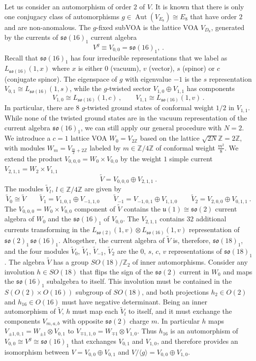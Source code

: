 \documentclass[11pt,reqno]{article}
\newcommand{\be}{\begin{equation}}
\newcommand{\ee}{\end{equation}}
\DeclareMathOperator{\Aut}{Aut}
\newcommand{\ZZ}{\mathbb{Z}}
\newcommand{\alg}[1]{\mathfrak{#1}}
\begin{document}
Let us consider an automorphism of order $2$ of $V$. It is known that there is only one conjugacy class of automorphisms $g\in \Aut(V_{E_8})\cong E_8$ that have order $2$ and are non-anomalous. The $g$-fixed subVOA is the lattice VOA $V_{D_8}$, generated by the currents of $\alg{so}(16)_1$ current algebra
\be V^g\equiv V_{0,0}=\alg{so}(16)_1,\ .
\ee Recall that $\alg{so}(16)_1$ has four irreducible representations that we label as $L_{\alg{so}(16)}(1,x)$ where $x$ is either $0$ (vacuum), $v$ (vector), $s$ (spinor) or $c$ (conjugate spinor). The eigenspace of $g$ with eigenvalue $-1$ is the $s$ representation $V_{0,1}\cong L_{\alg{so}(16)}(1,s)$, while the $g$-twisted sector $V_{1,0}\oplus V_{1,1}$ has components
\be V_{1,0}\cong  L_{\alg{so}(16)}(1,c)\ ,\qquad   V_{1,1}\cong L_{\alg{so}(16)}(1,v)\ .
\ee In particular, there are $8$ $g$-twisted ground states of conformal weight $1/2$ in $V_{1,1}$. While none of the twisted ground states are in the vacuum representation of the current algebra $\alg{so}(16)_1$, we can still apply our general procedure with $N=2$. We introduce a $c=1$ lattice VOA $W_0=V_{2\ZZ}$ based on the lattice $\sqrt{2N}\ZZ=2\ZZ$, with modules $W_m=V_{\frac{m}{2}+2\ZZ}$ labeled by $m\in \ZZ/4\ZZ$ of conformal weight $\frac{m^2}{8}$. We extend the product $V_{0,0,0}=W_0\times V_{0,0}$ by the weight $1$ simple current $V_{2,1,1}=W_2\times V_{1,1}$
\be \tilde V=V_{0,0,0}\oplus V_{2,1,1}\ .
\ee The modules $\tilde V_l$, $l\in\ZZ/4\ZZ$ are given by
\be \tilde V_0\cong \tilde V\qquad \tilde V_1=V_{1,0,1}\oplus V_{-1,1,0}\qquad \tilde V_{-1}=V_{-1,0,1}\oplus V_{1,1,0}\qquad \tilde V_2=V_{2,0,0}\oplus V_{0,1,1}\ .
\ee The $V_{0,0,0}=W_0\times V_{0,0}$ component of $\tilde V$ contains the $\alg{u}(1)\cong \alg{so}(2)$ current algebra of $W_0$ and the $\alg{so}(16)_1$ of $V_{0,0}$. The $V_{2,1,1}$ contains $32$ additional currents transforming in the $L_{\alg{so}(2)}(1,v)\otimes L_{\alg{so}(16)}(1,v)$ representation of $\alg{so}(2)_1\, \alg{so}(16)_1$. Altogether, the current algebra of $\tilde V$ is, therefore, $\alg{so}(18)_1$, and the four modules $\tilde V_0$, $\tilde V_1$, $\tilde  V_{-1}$, $\tilde V_2$ are the $0$, $s$, $c$, $v$ representations of $\alg{so}(18)_1$. The algebra $\tilde V$ has a group $SO(18)/\ZZ_2$ of inner automorphisms. Consider any involution $h\in SO(18)$ that flips the sign of the $\alg{so}(2)$ current in $W_0$ and maps the $\alg{so}(16)_1$ subalgebra to itself. This involution must be contained in the $S(O(2)\times O(16))$ subgroup of $SO(18)$, and both projections $h_2\in O(2)$ and $h_{16}\in O(16)$ must have negative determinant. Being an inner automorphism of $\tilde V$, $h$ must map each $\tilde V_l$ to itself, and it must exchange the components $V_{m,a,b}$ with opposite $\alg{so}(2)$ charge $m$. In particular $h$ maps $V_{\pm 1, 0,1}=W_{\pm 1}\otimes V_{0,1}$ to $V_{\mp 1,1,0}=W_{\mp 1}\otimes V_{1,0}$. Thus $h_{16}$ is an automorphism of $V_{0,0}\cong V^g\cong \alg{so}(16)_1$ that exchanges $V_{0,1}$ and $V_{1,0}$, and therefore provides an isomorphism between $V=V_{0,0}\oplus V_{0,1}$ and $V/\langle g\rangle=V_{0,0}\oplus V_{1,0}$.
\end{document}
